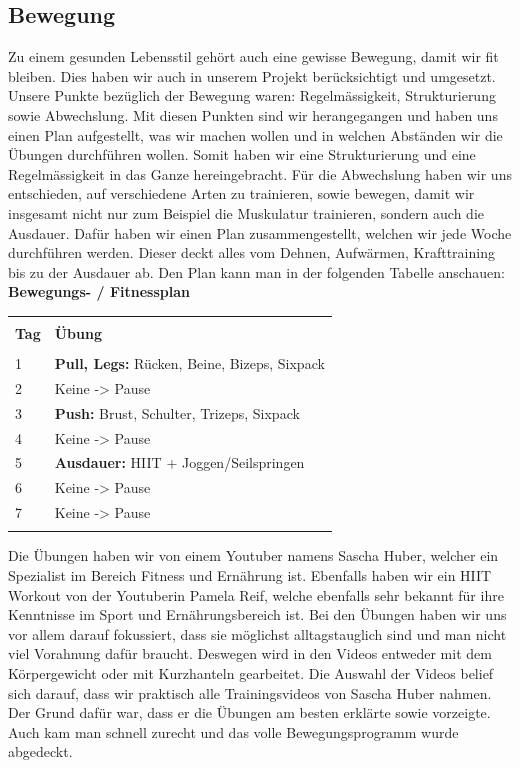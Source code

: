 \subsection{Bewegung}
\authortoc{\bastian}{\subsectionident}
Zu einem gesunden Lebensstil gehört auch eine gewisse Bewegung, damit wir fit bleiben. Dies haben wir auch in unserem Projekt berücksichtigt und umgesetzt. Unsere Punkte bezüglich der Bewegung waren: Regelmässigkeit, Strukturierung sowie Abwechslung. Mit diesen Punkten sind wir herangegangen und haben uns einen Plan aufgestellt, was wir machen wollen und in welchen Abständen wir die Übungen durchführen wollen. Somit haben wir eine Strukturierung und eine Regelmässigkeit in das Ganze hereingebracht. Für die Abwechslung haben wir uns entschieden, auf verschiedene Arten zu trainieren, sowie bewegen, damit wir insgesamt nicht nur zum Beispiel die Muskulatur trainieren, sondern auch die Ausdauer. Dafür haben wir einen Plan zusammengestellt, welchen wir jede Woche durchführen werden. Dieser deckt alles vom Dehnen, Aufwärmen, Krafttraining bis zu der Ausdauer ab. Den Plan kann man in der folgenden Tabelle anschauen:
\newline
\newline
\textbf{Bewegungs- / Fitnessplan}
\newline
\begin{table}[htp]
  \begin{tabularx}{\textwidth}{l X}\hline \\
    \textbf{Tag} & \textbf{Übung}  \\\hline \\
    1 & \textbf{Pull, Legs:} Rücken, Beine, Bizeps, Sixpack \\
    2 & Keine -> Pause \\
    3 & \textbf{Push:} Brust, Schulter, Trizeps, Sixpack \\
    4 & Keine -> Pause \\
    5 & \textbf{Ausdauer:} HIIT + Joggen/Seilspringen \\
    6 & Keine -> Pause \\
    7 & Keine -> Pause \\
    \\\hline
  \end{tabularx}
\end{table}
\newline
Die Übungen haben wir von einem Youtuber namens Sascha Huber, welcher ein Spezialist im Bereich Fitness und Ernährung ist. Ebenfalls haben wir ein HIIT Workout von der Youtuberin Pamela Reif, welche ebenfalls sehr bekannt für ihre Kenntnisse im Sport und Ernährungsbereich ist. Bei den Übungen haben wir uns vor allem darauf fokussiert, dass sie möglichst alltagstauglich sind und man nicht viel Vorahnung dafür braucht. Deswegen wird in den Videos entweder mit dem Körpergewicht oder mit Kurzhanteln gearbeitet. Die Auswahl der Videos belief sich darauf, dass wir praktisch alle Trainingsvideos von Sascha Huber nahmen. Der Grund dafür war, dass er die Übungen am besten erklärte sowie vorzeigte. Auch kam man schnell zurecht und das volle Bewegungsprogramm wurde abgedeckt.
